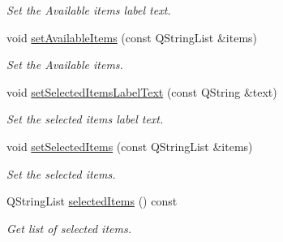 \begin{DoxyCompactItemize}
\begin{DoxyCompactList}\small\item\em Set the Available items label text. \end{DoxyCompactList}\item 
\hypertarget{classmdt_items_selector_dialog_a2d5184d36f2b0e7cfbea39b055b2e19d}{
void \hyperlink{classmdt_items_selector_dialog_a2d5184d36f2b0e7cfbea39b055b2e19d}{setAvailableItems} (const QStringList \&items)}
\label{classmdt_items_selector_dialog_a2d5184d36f2b0e7cfbea39b055b2e19d}

\begin{DoxyCompactList}\small\item\em Set the Available items. \end{DoxyCompactList}\item 
\hypertarget{classmdt_items_selector_dialog_a09e9df0c7cac2de513846916f47aa420}{
void \hyperlink{classmdt_items_selector_dialog_a09e9df0c7cac2de513846916f47aa420}{setSelectedItemsLabelText} (const QString \&text)}
\label{classmdt_items_selector_dialog_a09e9df0c7cac2de513846916f47aa420}

\begin{DoxyCompactList}\small\item\em Set the selected items label text. \end{DoxyCompactList}\item 
\hypertarget{classmdt_items_selector_dialog_a8d6642276892d9366704ccf07067020b}{
void \hyperlink{classmdt_items_selector_dialog_a8d6642276892d9366704ccf07067020b}{setSelectedItems} (const QStringList \&items)}
\label{classmdt_items_selector_dialog_a8d6642276892d9366704ccf07067020b}

\begin{DoxyCompactList}\small\item\em Set the selected items. \end{DoxyCompactList}\item 
\hypertarget{classmdt_items_selector_dialog_af6a5f0a0f046391287d3beec91b205d6}{
QStringList \hyperlink{classmdt_items_selector_dialog_af6a5f0a0f046391287d3beec91b205d6}{selectedItems} () const }
\label{classmdt_items_selector_dialog_af6a5f0a0f046391287d3beec91b205d6}

\begin{DoxyCompactList}\small\item\em Get list of selected items. \end{DoxyCompactList}\end{DoxyCompactItemize}


